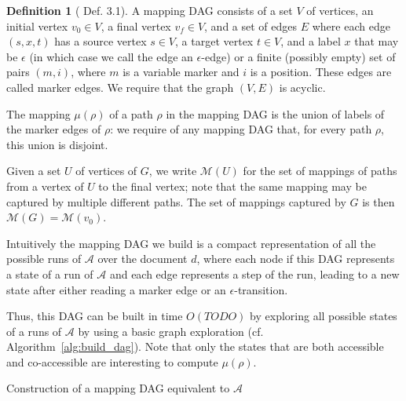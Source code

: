 \documentclass[12px]{article}
\theoremstyle{definition}
\newtheorem{definition}{Definition}
\begin{document}
        \begin{definition}[\cite{ICDT19} Def. 3.1]
          A mapping DAG consists of a set $V$ of vertices, an initial vertex
          $v_0 \in V$, a final vertex $v_f \in V$, and a set of edges $E$ where
          each edge $(s, x, t)$ has a source vertex $s \in V$, a target vertex
          $t \in V$, and a label $x$ that may be $\epsilon$ (in which case we
          call the edge an $\epsilon$-edge) or a finite (possibly empty) set of
          pairs $(m, i)$, where $m$ is a variable marker and $i$ is a position.
          These edges are called marker edges. We require that the graph $(V,
          E)$ is acyclic.

          The mapping $\mu(\rho)$ of a path $\rho$ in the mapping DAG is the
          union of labels of the marker edges of $\rho$: we require of any
          mapping DAG that, for every path $\rho$, this union is disjoint.

          Given a set $U$ of vertices of $G$, we write $\mathcal{M}(U)$ for the
          set of mappings of paths from a vertex of $U$ to the final vertex;
          note that the same mapping may be captured by multiple different
          paths. The set of mappings captured by $G$ is then $\mathcal{M}(G) =
          \mathcal{M}({v_0})$.
        \end{definition}

        Intuitively the mapping DAG we build is a compact representation of all
        the possible runs of $\mathcal{A}$ over the document $d$, where each
        node if this DAG represents a state of a run of $\mathcal{A}$ and each
        edge represents a step of the run, leading to a new state after either
        reading a marker edge or an $\epsilon$-transition.

        Thus, this DAG can be built in time $O(TODO)$ by exploring all possible
        states of a runs of $\mathcal{A}$ by using a basic graph exploration
        (cf.  Algorithm~\ref{alg:build_dag}). Note that only the states that
        are both accessible and co-accessible are interesting to compute
        $\mu(\rho)$.

        \begin{algorithm}[H]
          \caption{Construction of a mapping DAG equivalent to $\mathcal{A}$}%
          \label{alg:build_dag}
          \begin{algorithmic}[1]
          \end{algorithmic}
        \end{algorithm}
\end{document}
